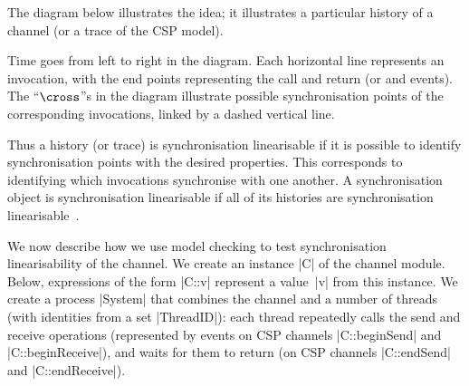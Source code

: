 The diagram below illustrates the idea; it illustrates a particular history
of a channel (or a trace of the CSP model).
%
\begin{center}
\unScalaMid
{}
\scalaMid
\end{center}
%
Time goes from left to right in the diagram.  Each horizontal line represents
an invocation, with the end points representing the call and return (or
 and  events).  The ``$\cross$''s in the diagram
illustrate possible synchronisation points of the corresponding invocations,
linked by a dashed vertical line.

Thus a history (or trace) is synchronisation linearisable if it is possible to
identify synchronisation points with the desired properties.  This corresponds
to identifying which invocations synchronise with one another.  A
synchronisation object is synchronisation linearisable if all of its histories
are synchronisation linearisable~\cite{LL:synchronisation}.


\inlineCSP

We now describe how we use model checking to test synchronisation
linearisability of the channel.  We create an instance |C| of the channel
module.  Below, expressions of the form |C::v| represent a value~|v| from this
instance.  We create a process |System| that combines the channel and a number
of threads (with identities from a set |ThreadID|): each thread repeatedly
calls the send and receive operations (represented by events on CSP channels
|C::beginSend| and |C::beginReceive|), and waits for them to return (on CSP
channels |C::endSend| and |C::endReceive|).

